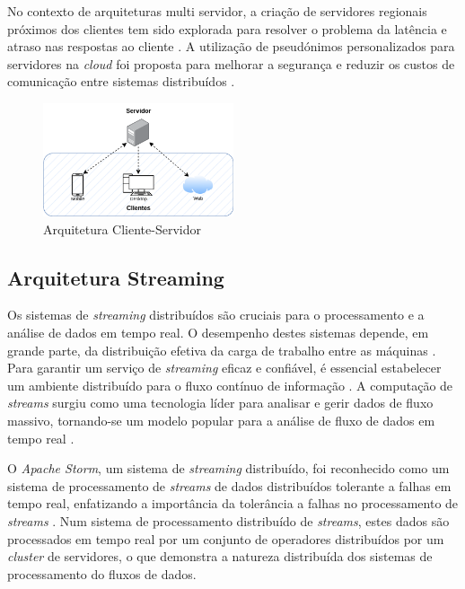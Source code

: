 No contexto de arquiteturas multi servidor, a criação de servidores regionais próximos dos clientes 
tem sido explorada para resolver o problema da latência e atraso nas respostas ao cliente 
\cite{clientserver2022b}. A utilização de pseudónimos personalizados para servidores na 
\textit{cloud} foi proposta para melhorar a segurança e reduzir os custos de comunicação entre
sistemas distribuídos \cite{clientserver2017}.

\begin{figure}[H]
    \centering
    \includegraphics[width=0.5\textwidth]{media/content/estado-arte/client-server.png}
    \caption{Arquitetura Cliente-Servidor}
    \label{fig:client-server}
\end{figure}

\subsection{Arquitetura Streaming}

Os sistemas de \textit{streaming} distribuídos são cruciais para o processamento e a análise de dados 
em tempo real. O desempenho destes sistemas depende, em grande parte, da distribuição efetiva da 
carga de trabalho entre as máquinas \cite{stream2020}. Para garantir um serviço de \textit{streaming} 
eficaz e confiável, é essencial estabelecer um ambiente distribuído para o fluxo contínuo de 
informação \cite{stream2014}. A computação de \textit{streams} surgiu como uma tecnologia líder 
para analisar e gerir dados de fluxo massivo, tornando-se um modelo popular para a análise de 
fluxo de dados em tempo real \cite{stream2018} \cite{stream2018b}.

O \textit{Apache Storm}, um sistema de \textit{streaming} distribuído, foi reconhecido como um 
sistema de processamento de \textit{streams} de dados distribuídos tolerante a falhas em tempo real, 
enfatizando a importância da tolerância a falhas no processamento de \textit{streams} 
\cite{stormattwitter}. Num sistema de processamento distribuído de \textit{streams}, estes dados 
são processados em tempo real por um conjunto de operadores distribuídos por um \textit{\gls{cluster}}
de servidores, o que demonstra a natureza distribuída dos sistemas de processamento do fluxos de dados.

